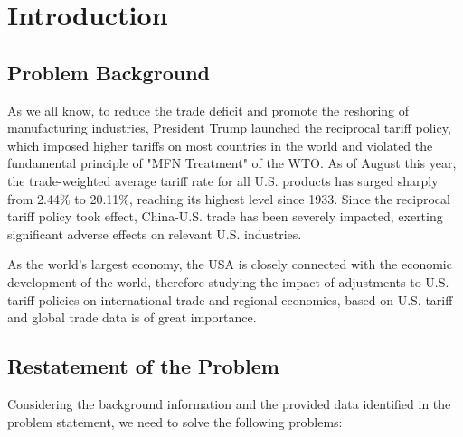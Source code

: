 \documentclass[12pt]{article}
\begin{document}
\newpage
\tableofcontents

\newpage
{}
\setcounter{page}{1}

\section{Introduction}

\subsection{Problem Background}
As we all know, to reduce the trade deficit and promote the reshoring of manufacturing industries, President Trump launched the reciprocal tariff policy, which imposed higher tariffs on most countries in the world and violated the fundamental principle of "MFN Treatment" of the WTO. As of August this year, the trade-weighted average tariff rate for all U.S. products has surged sharply from 2.44\% to 20.11\%, reaching its highest level since 1933. Since the reciprocal tariff policy took effect, China-U.S. trade has been severely impacted, exerting significant adverse effects on relevant U.S. industries.

As the world's largest economy, the USA is closely connected with the economic development of the world, therefore studying the impact of adjustments to U.S. tariff policies on international trade and regional economies, based on U.S. tariff and global trade data is of great importance.

\subsection{Restatement of the Problem}
Considering the background information and the provided data identified in the problem statement, we need to solve the following problems:
\end{document}
